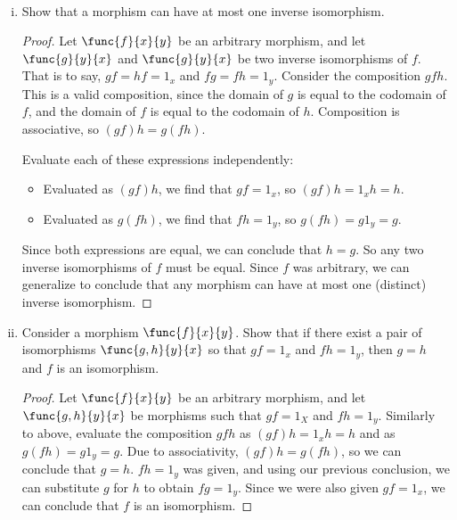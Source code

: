 \documentclass[main.tex]{subfiles}
\begin{document}
\paragraph{}
\begin{exercise}\leavevmode
	\begin{enumerate}[(i)]
		\item Show that a morphism can have at most one inverse isomorphism.
			\begin{proof}
				Let \(\func{f}{x}{y}\) be an arbitrary morphism, and let
				\(\func{g}{y}{x}\) and \(\func{g}{y}{x}\) be two inverse
				isomorphisms of \(f\). That is to say, \(gf=hf=1_{x}\) and
				\(fg=fh=1_{y}\). Consider the composition \(gfh\). This is a
				valid composition, since the domain of \(g\) is equal to the
				codomain of \(f\), and the domain of \(f\) is equal to the
				codomain of \(h\). Composition is associative, so \((gf)h =
				g(fh)\).

				Evaluate each of these expressions independently:
				\begin{itemize}
					\item Evaluated as \((gf)h\), we find that \(gf=1_{x}\), so
						\((gf)h=1_{x}h=h\).
					\item Evaluated as \(g(fh)\), we find that \(fh=1_{y}\), so
						\(g(fh)=g1_{y}=g\).
				\end{itemize}

				Since both expressions are equal, we can conclude that \(h=g\).
				So any two inverse isomorphisms of \(f\) must be equal. Since
				\(f\) was arbitrary, we can generalize to conclude that any
				morphism can have at most one (distinct) inverse isomorphism.
			\end{proof}

		\item Consider a morphism \(\func{f}{x}{y}\). Show that if there exist a
			pair of isomorphisms \(\func{g,h}{y}{x}\) so that \(gf=1_{x}\) and
			\(fh=1_{y}\), then \(g=h\) and \(f\) is an isomorphism.\\
			\begin{proof}
				Let \(\func{f}{x}{y}\) be an arbitrary morphism, and let
				\(\func{g,h}{y}{x}\) be morphisms such that \(gf=1_{X}\) and
				\(fh=1_{y}\). Similarly to above, evaluate the composition
				\(gfh\) as \((gf)h=1_{x}h=h\) and as \(g(fh)=g1_{y}=g\). Due to
				associativity, \((gf)h=g(fh)\), so we can conclude that \(g=h\).
				\(fh=1_{y}\) was given, and using our previous conclusion, we can
				substitute \(g\) for \(h\) to obtain \(fg=1_{y}\). Since we were
				also given \(gf=1_{x}\), we can conclude that \(f\) is an
				isomorphism.
			\end{proof}
	\end{enumerate}
\end{exercise}
\end{document}
